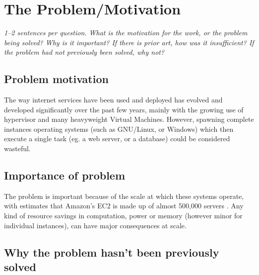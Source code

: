 \documentclass[11pt]{article}
\begin{document}
\begin{itemize}





\end{itemize}


\section*{The Problem/Motivation}

\textsl{1--2 sentences per question. What is the motivation for the work, or
the problem being solved? Why is it important? If there is prior art, how was
it insufficient? If the problem had not previously been solved, why not?}


\subsection*{Problem motivation}

The way internet services have been used and deployed has evolved and developed
significantly over the past few years, mainly with the growing use of
hypervisor and many heavyweight Virtual Machines. However, spawning complete
instances operating systems (such as GNU/Linux, or Windows) which then execute
a single task (eg. a web server, or a database) could be considered wasteful.


\subsection*{Importance of problem}

The problem is important because of the scale at which these systems operate,
with estimates that Amazon's EC2 is made up of almost 500,000 servers
\cite{EC2Amount}. Any kind of resource savings in computation, power or memory
(however minor for individual instances), can have major consequences at scale.

\subsection*{Why the problem hasn't been previously solved}
\end{document}
